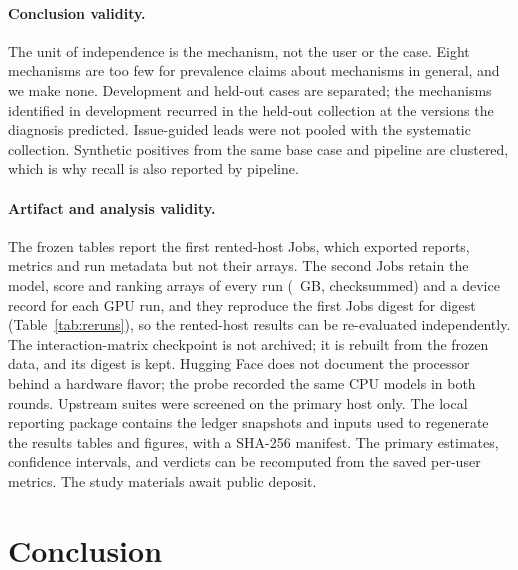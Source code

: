\documentclass[11pt,a4paper]{article}
\begin{document}
\paragraph{Conclusion validity.} The unit of independence is the mechanism,
not the user or the case. Eight mechanisms are too few for prevalence claims
about mechanisms in general, and we make none. Development and held-out cases
are separated; the mechanisms identified in development recurred in the
held-out collection at the versions the diagnosis predicted. Issue-guided
leads were not pooled with the systematic collection. Synthetic positives from
the same base case and pipeline are clustered, which is why recall is also
reported by pipeline.

\paragraph{Artifact and analysis validity.}
The frozen tables report the first rented-host Jobs, which exported reports,
metrics and run metadata but not their arrays. The second Jobs retain the
model, score and ranking arrays of every run (\rerunGigabytes{}~GB,
checksummed) and a device record for each GPU run, and they reproduce the
first Jobs digest for digest (Table~\ref{tab:reruns}), so the rented-host
results can be re-evaluated independently. The interaction-matrix checkpoint
is not archived; it is rebuilt from the frozen data, and its digest is kept.
Hugging Face does not document the processor behind a hardware flavor; the
probe recorded the same CPU models in both rounds. Upstream suites were
screened on the primary host only. The local reporting package contains
the ledger snapshots and inputs used to regenerate the results tables and
figures, with a SHA-256 manifest. The primary estimates, confidence intervals,
and verdicts can be recomputed from the saved per-user metrics. The study
materials await public deposit.

\section{Conclusion}
\label{sec:conclusion}
\end{document}
